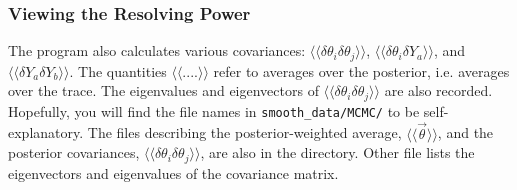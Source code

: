 \documentclass[UserManual.tex]{subfiles}
\begin{document}
\begin{sloppypar}
\subsubsection{Viewing the Resolving Power}

The program also calculates various covariances:
$\langle\langle\delta\theta_i\delta\theta_j\rangle\rangle$,  $\langle\langle\delta\theta_i\delta Y_a\rangle\rangle$, and $\langle\langle\delta Y_a\delta Y_b\rangle\rangle$. The quantities $\langle\langle....\rangle\rangle$ refer to averages over the  posterior, i.e. averages over the trace. The eigenvalues and eigenvectors of $\langle\langle\delta\theta_i\delta\theta_j\rangle\rangle$ are also recorded. Hopefully, you will find the file names in {\tt smooth\_data/MCMC/} to be self-explanatory. The files describing the posterior-weighted average, $\langle\langle \vec{\theta}\rangle\rangle$, and the posterior covariances, $\langle\langle\delta\theta_i\delta\theta_j\rangle\rangle$, are also in the directory. Other file lists the eigenvectors and eigenvalues of the covariance matrix. 


\end{sloppypar}
\end{document}
